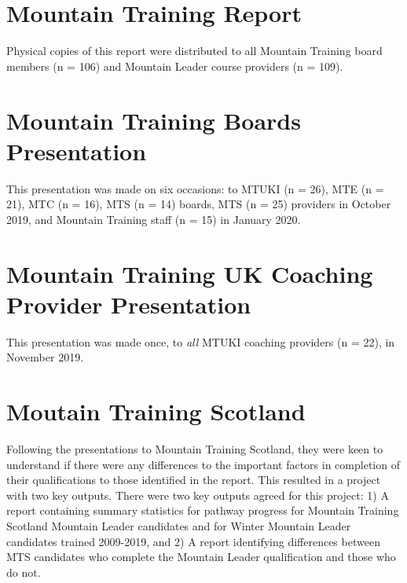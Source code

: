 \documentclass[
  12pt,
  a4paper,
]{book}
\begin{document}
\hypertarget{impact-report}{%
\section{Mountain Training Report}\label{impact-report}}

Physical copies of this report were distributed to all Mountain Training board members (n = 106) and Mountain Leader course providers (n = 109).



\hypertarget{impact-board-pres}{%
\section{Mountain Training Boards Presentation}\label{impact-board-pres}}

This presentation was made on six occasions: to MTUKI (n = 26), MTE (n = 21), MTC (n = 16), MTS (n = 14) boards, MTS (n = 25) providers in October 2019, and Mountain Training staff (n = 15) in January 2020.



\hypertarget{impact-coach-pres}{%
\section{Mountain Training UK Coaching Provider Presentation}\label{impact-coach-pres}}

This presentation was made once, to \emph{all} MTUKI coaching providers (n = 22), in November 2019.



\hypertarget{impact-mts}{%
\section{Moutain Training Scotland}\label{impact-mts}}

Following the presentations to Mountain Training Scotland, they were keen to understand if there were any differences to the important factors in completion of their qualifications to those identified in the report. This resulted in a project with two key outputs. There were two key outputs agreed for this project: 1) A report containing summary statistics for pathway progress for Mountain Training Scotland Mountain Leader candidates and for Winter Mountain Leader candidates trained 2009-2019, and 2) A report identifying differences between MTS candidates who complete the Mountain Leader qualification and those who do not.
\end{document}
